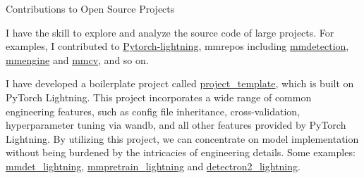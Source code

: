 \begin{cventries}
	\cventry
	{} %
	{Contributions to Open Source Projects} %
	{\hfill} %
	{} %
	{
		\vspace{-3.5mm}
		\begin{cvitems} %
			\item{I have the skill to explore and analyze the source code of large projects. For examples, I contributed to \href{https://github.com/Lightning-AI/lightning}{\textcolor{link}{Pytorch-lightning}}, mmrepos including \href{https://github.com/open-mmlab/mmdetection}{\textcolor{link}{mmdetection}}, \href{https://github.com/open-mmlab/mmengine}{\textcolor{link}{mmengine}} and \href{https://github.com/open-mmlab/mmcv}{\textcolor{link}{mmcv}}, and so on.}
			\item{I have developed a boilerplate project called \href{https://github.com/shenmishajing/project_template}{\textcolor{link}{project\_template}}, which is built on PyTorch Lightning. This project incorporates a wide range of common engineering features, such as config file inheritance, cross-validation, hyperparameter tuning via wandb, and all other features provided by PyTorch Lightning. By utilizing this project, we can concentrate on model implementation without being burdened by the intricacies of engineering details. Some examples: \href{https://github.com/shenmishajing/mmdet_lightning}{\textcolor{link}{mmdet\_lightning}}, \href{https://github.com/shenmishajing/mmpretrain_lightning}{\textcolor{link}{mmpretrain\_lightning}} and \href{https://github.com/shenmishajing/detectron2_lightning}{\textcolor{link}{detectron2\_lightning}}.}
		\end{cvitems}
	}
\end{cventries}
